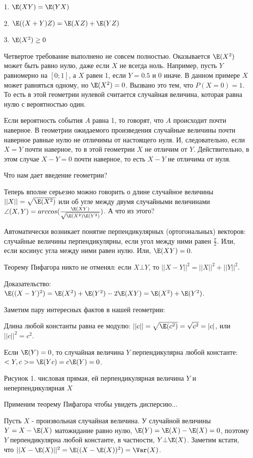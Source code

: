 1. $\E(XY)=\E(YX)$

2. $\E((X+Y)Z)=\E(XZ)+\E(YZ)$

3. $\E(X^2)\geq 0$

Четвертое требование выполнено не совсем полностью. Оказывается $\E(X^2)$ может быть равно нулю, даже если $X$ не всегда ноль. Например, пусть $Y$ равномерно на $[0;1]$, а $X$ равен 1, если $Y=0.5$ и 0 иначе. В данном примере $X$ может равняться одному, но  $\E(X^{2})=0$. Вызвано это тем, что $P(X=0)=1$. То есть в этой геометрии нулевой считается случайная величина, которая равна нулю с вероятностью один. 

Если вероятность события $A$ равна 1, то говорят, что $A$ происходит почти наверное. В геометрии ожидаемого произведения случайные величины почти наверное равные нулю не отличимы от настоящего нуля. И, следовательно, если $X=Y$ почти наверное, то в этой геометрии $X$ не отличим от $Y$. Действительно, в этом случае $X-Y=0$ почти наверное, то есть $X-Y$ не отличима от нуля.

Что нам дает введение геометрии?

Теперь вполне серьезно можно говорить о длине случайное величины $||X||=\sqrt{\E(X^{2})}$ или об угле между двумя случайными величинами $\angle(X,Y)=arccos(\frac{\E(XY)}{\sqrt{\E(X^{2})\E(Y^{2})}})$. А что из этого?

Автоматически возникает понятие перпендикулярных (ортогональных) векторов: случайные величины перпендикулярны, если угол между ними равен $\frac{\pi}{2}$. Или, если косинус угла между ними равен нулю. Или, $\E(XY)=0$.

Теорему Пифагора никто не отменял: если $X\bot Y$, то $||X-Y||^{2}=||X||^{2}+||Y||^{2}$.

Доказательство: $\E((X-Y)^2)=\E(X^{2})+\E(Y^{2})-2\E(XY)=\E(X^{2})+\E(Y^{2})$.

Заметим пару интересных фактов в нашей геометрии: 

Длина любой константы равна ее модулю: $||c||=\sqrt{\E(c^{2})}=\sqrt{c^{2}}=|c|$, или $||c||^{2}=c^{2}$.

Если $\E(Y)=0$, то случайная величина $Y$ перпендикулярна любой константе: $<Y,c>=\E(Yc)=c\E(Y)=0$.

Рисунок 1. числовая прямая, ей перпендикулярная величина $Y$ и неперпендикулярная $X$

Применим теорему Пифагора чтобы увидеть дисперсию...

Пусть $X$ - произвольная случайная величина. У случайной величины $Y=X-\E(X)$ матожидание равно нулю, $\E(Y)=\E(X)-\E(X)=0$, поэтому $Y$ перпендикулярна любой константе, в частности, $Y\bot \E(X)$. Заметим кстати, что $||X-\E(X)||^{2}=\E((X-\E(X))^{2})=\Var(X)$.

